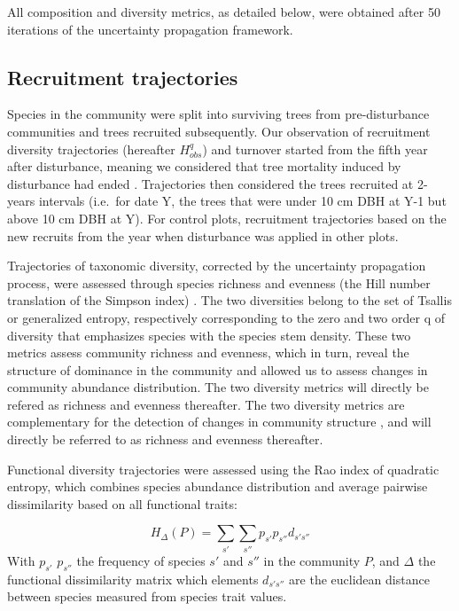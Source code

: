 \documentclass[fleqn,10pt]{ArtEcoFoG} %
\begin{document}
All composition and diversity metrics, as detailed below, were obtained after 50 iterations of the uncertainty propagation framework.

\hypertarget{recruitment-trajectories}{%
\subsection{Recruitment trajectories}\label{recruitment-trajectories}}

Species in the community were split into surviving trees from pre-disturbance communities and trees recruited subsequently. Our observation of recruitment diversity trajectories (hereafter \(H^q_{obs}\)) and turnover started from the fifth year after disturbance, meaning we considered that tree mortality induced by disturbance had ended \citep{Piponiot2016}. Trajectories then considered the trees recruited at 2-years intervals (i.e.~for date Y, the trees that were under 10 cm DBH at Y-1 but above 10 cm DBH at Y). For control plots, recruitment trajectories based on the new recruits from the year when disturbance was applied in other plots.

Trajectories of taxonomic diversity, corrected by the uncertainty propagation process, were assessed through species richness and evenness (the Hill number translation of the Simpson index) \citep{Chao2015, Marcon2015}.
The two diversities belong to the set of Tsallis or generalized entropy, respectively corresponding to the zero and two order q of diversity that emphasizes species with the species stem density. These two metrics assess community richness and evenness, which in turn, reveal the structure of dominance in the community and allowed us to assess changes in community abundance distribution.
The two diversity metrics will directly be refered as richness and evenness thereafter.
The two diversity metrics are complementary for the detection of changes in community structure \citep{Magurran2004}, and will directly be referred to as richness and evenness thereafter.

Functional diversity trajectories were assessed using the Rao index of quadratic entropy, which combines species abundance distribution and average pairwise dissimilarity based on all functional traits:

\[H_\Delta(P) = \sum_{s'}\sum_{s''}p_{s'}p_{s''}d_{s's''}\]
With \(p_{s'}\) \(p_{s''}\) the frequency of species \(s'\) and \(s''\) in the community \(P\), and \(\Delta\) the functional dissimilarity matrix which elements \(d_{s's''}\) are the euclidean distance between species measured from species trait values.
\end{document}
